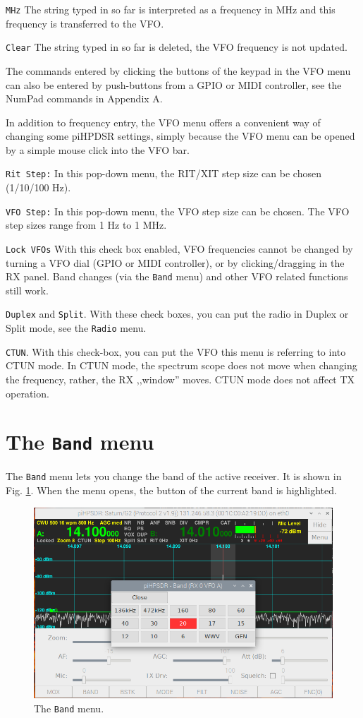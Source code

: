 \documentclass[12pt]{book}
\def\rett#1{\texttt{\color{red}#1}}
\def\bltt#1{\texttt{\color{blue}#1}}
\begin{document}
\rett{MHz} The string typed in so far is interpreted as a frequency in MHz
and this frequency is transferred to the VFO.

\rett{Clear} The string typed in so far is deleted, the VFO frequency is not
updated.

The commands entered by clicking the buttons of the keypad in the VFO menu
can also be entered by push-buttons from a GPIO or MIDI controller, see
the NumPad commands in Appendix A.

In addition to frequency entry, the VFO menu offers a convenient way of changing
some piHPDSR settings, simply because the VFO menu can be opened by a simple
mouse click into the VFO bar.

\rett{Rit Step:} In this pop-down menu, the RIT/XIT step size can be chosen
 (1/10/100 Hz).

\rett{VFO Step:} In this pop-down menu, the VFO step size can be chosen. The VFO step
sizes range from 1 Hz to 1 MHz.

\rett{Lock VFOs} With this check box enabled, VFO frequencies cannot be changed by
turning a VFO dial (GPIO or MIDI controller), or by clicking/dragging in the RX panel.
Band changes (via the \bltt{Band} menu) and other VFO related functions still work.

\rett{Duplex} and \rett{Split}. With these check boxes, you can put the radio
in Duplex or Split mode, see the \bltt{Radio} menu.

\rett{CTUN}. With this check-box, you can put the VFO this menu is referring to into
CTUN mode. In CTUN mode, the spectrum scope does not move when changing the frequency, 
rather, the RX ,,window'' moves. CTUN mode does not affect TX operation.

\section{The \texttt{Band} menu}
\label{sec:bandmenu}
The \bltt{Band} menu lets you change the band of the active receiver. It is shown
in Fig. \ref{fig:BandMenu}. When the menu opens, the button of the current band
is highlighted.

\begin{figure}[ht]
\center
\includegraphics[width=12cm]{BandMenu.png}
\caption{The \bltt{Band} menu.}
\label{fig:BandMenu}
\end{figure}
\end{document}
